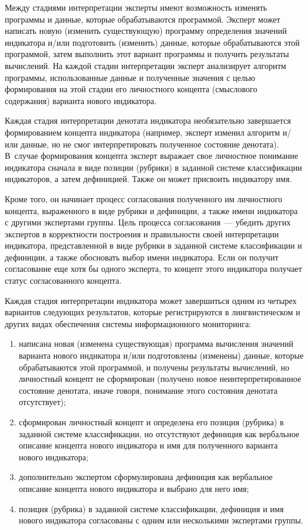 \begin{multicols}{2}
   Между стадиями интерпретации эксперты имеют возможность изменять программы и 
данные, которые обрабатываются программой. Эксперт может написать новую (изменить 
существующую) программу определения значений индикатора и/или подготовить (изменить) 
данные, которые обрабатываются этой программой, затем выполнить этот вариант 
программы и получить результаты вы\-чис\-ле\-ний. На каждой стадии интерпретации эксперт 
анализирует алгоритм программы, использованные данные и полученные значения с целью 
формирования на этой стадии его личностного концепта (смыслового содержания) варианта 
нового индикатора.
   
   Каждая стадия интерпретации денотата индикатора необязательно завершается 
формированием концепта индикатора (например, эксперт изменил алгоритм и/или данные, 
но не смог интерпретировать полученное состояние денотата). В~случае формирования 
концепта эксперт выражает свое личностное понимание индикатора сначала в виде позиции 
(рубрики) в заданной системе классификации индикаторов, а затем дефиницией. Также он 
может присвоить индикатору имя.
   
   Кроме того, он начинает процесс согласования полученного им личностного концепта, 
выраженного в виде рубрики и дефиниции, а также имени индикатора с другими экспертами 
группы. Цель процесса согласования~--- убедить других экспертов в корректности 
построения и правильности своей интерпретации индикатора, представленной в виде 
рубрики в заданной системе классификации и дефиниции, а также обосновать выбор имени 
индикатора. Если он получит согласование еще хотя бы одного эксперта, то концепт этого 
индикатора получает статус согласованного концепта.
   
   Каждая стадия интерпретации индикатора может завершиться одним из четырех 
вариантов следующих результатов, которые регистрируются в лингвистическом и других 
видах обеспечения системы информационного мониторинга:
   \begin{enumerate}[(1)]
\item написана новая (изменена существующая) программа вычисления значений варианта 
нового индикатора и/или подготовлены (изменены) данные, которые обрабатываются этой 
программой, и получены результаты вычислений, но личностный концепт не 
сформирован (получено новое неинтерпретированное состояние денотата, иначе говоря, 
понимание этого состояния денотата отсутствует);
\item сформирован личностный концепт и определена его позиция (рубрика) в заданной 
системе классификации, но отсутствуют дефиниция как вербальное описание концепта 
нового индикатора и имя для полученного варианта нового индикатора;
\item дополнительно экспертом сформулирована дефиниция как вербальное описание 
концепта нового индикатора и выбрано для него имя;
\item позиция (рубрика) в заданной системе классификации, дефиниция и имя нового 
индикатора согласованы с одним или несколькими экспертами группы.
\end{enumerate}


\end{multicols}
